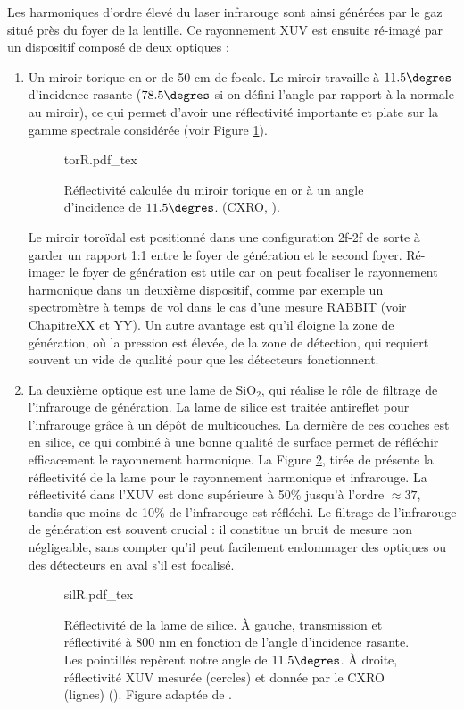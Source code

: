 Les harmoniques d'ordre élevé du laser infrarouge sont ainsi générées par le gaz situé près du foyer de la lentille. Ce rayonnement XUV est ensuite ré-imagé par un dispositif composé de deux optiques :
\begin{enumerate}
\item Un miroir torique en or de 50 cm de focale. Le miroir travaille à $11.5\degres$ d'incidence rasante ($78.5\degres$ si on défini l'angle par rapport à la normale au miroir), ce qui permet d'avoir une réflectivité importante et plate sur la gamme spectrale considérée (voir Figure \ref{Fig:TorR}).

\begin{figure}[!ht]
\centering
\def\svgwidth{0.6\columnwidth}
{torR.pdf_tex}
\caption{Réflectivité calculée du miroir torique en or à un angle d'incidence de $11.5\degres$. (CXRO, ).}
\label{Fig:TorR}
\end{figure}

Le miroir toroïdal est positionné dans une configuration 2f-2f de sorte à garder un rapport 1:1 entre le foyer de génération et le second foyer. Ré-imager le foyer de génération est utile car on peut focaliser le rayonnement harmonique dans un deuxième dispositif, comme par exemple un spectromètre à temps de vol dans le cas d'une mesure RABBIT (voir ChapitreXX et YY). Un autre avantage est qu'il éloigne la zone de génération, où la pression est élevée, de la zone de détection, qui requiert souvent un vide de qualité pour que les détecteurs fonctionnent.\\

\item La deuxième optique est une lame de Si$\mbox{O}_{\mbox{2}}$, qui réalise le rôle de filtrage de l'infrarouge de génération. La lame de silice est traitée antireflet pour l'infrarouge grâce à un dépôt de multicouches. La dernière de ces couches est en silice, ce qui combiné à une bonne qualité de surface permet de réfléchir efficacement le rayonnement harmonique. La Figure \ref{Fig:SilR}, tirée de  présente la réflectivité de la lame pour le rayonnement harmonique et infrarouge. La réflectivité dans l'XUV est donc supérieure à 50\% jusqu'à l'ordre $\approx 37$, tandis que moins de 10\% de l'infrarouge est réfléchi. Le filtrage de l'infrarouge de génération est souvent crucial : il constitue un bruit de mesure non négligeable, sans compter qu'il peut facilement endommager des optiques ou des détecteurs en aval s'il est focalisé.

\begin{figure}[!ht]
\centering
\def\svgwidth{\columnwidth}
{silR.pdf_tex}
\caption{Réflectivité de la lame de silice. \`{A} gauche, transmission et réflectivité à 800 nm en fonction de l'angle d'incidence rasante. Les pointillés repèrent notre angle de $11.5\degres$. \`{A} droite, réflectivité XUV mesurée (cercles) et donnée par le CXRO (lignes) (). Figure adaptée de .}
\label{Fig:SilR}
\end{figure}
\end{enumerate}

